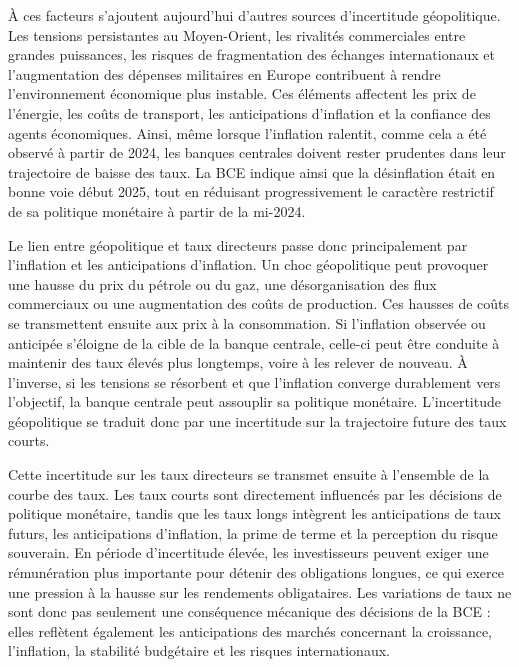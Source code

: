À ces facteurs s'ajoutent aujourd'hui d'autres sources d'incertitude géopolitique. Les tensions persistantes au Moyen-Orient, les rivalités commerciales entre grandes puissances, les risques de fragmentation des échanges internationaux et l'augmentation des dépenses militaires en Europe contribuent à rendre l'environnement économique plus instable. Ces éléments affectent les prix de l'énergie, les coûts de transport, les anticipations d'inflation et la confiance des agents économiques. Ainsi, même lorsque l'inflation ralentit, comme cela a été observé à partir de 2024, les banques centrales doivent rester prudentes dans leur trajectoire de baisse des taux. La BCE indique ainsi que la désinflation était en bonne voie début 2025, tout en réduisant progressivement le caractère restrictif de sa politique monétaire à partir de la mi-2024.

Le lien entre géopolitique et taux directeurs passe donc principalement par l'inflation et les anticipations d'inflation. Un choc géopolitique peut provoquer une hausse du prix du pétrole ou du gaz, une désorganisation des flux commerciaux ou une augmentation des coûts de production. Ces hausses de coûts se transmettent ensuite aux prix à la consommation. Si l'inflation observée ou anticipée s'éloigne de la cible de la banque centrale, celle-ci peut être conduite à maintenir des taux élevés plus longtemps, voire à les relever de nouveau. À l'inverse, si les tensions se résorbent et que l'inflation converge durablement vers l'objectif, la banque centrale peut assouplir sa politique monétaire. L'incertitude géopolitique se traduit donc par une incertitude sur la trajectoire future des taux courts.

Cette incertitude sur les taux directeurs se transmet ensuite à l'ensemble de la courbe des taux. Les taux courts sont directement influencés par les décisions de politique monétaire, tandis que les taux longs intègrent les anticipations de taux futurs, les anticipations d'inflation, la prime de terme et la perception du risque souverain. En période d'incertitude élevée, les investisseurs peuvent exiger une rémunération plus importante pour détenir des obligations longues, ce qui exerce une pression à la hausse sur les rendements obligataires. Les variations de taux ne sont donc pas seulement une conséquence mécanique des décisions de la BCE : elles reflètent également les anticipations des marchés concernant la croissance, l'inflation, la stabilité budgétaire et les risques internationaux.


